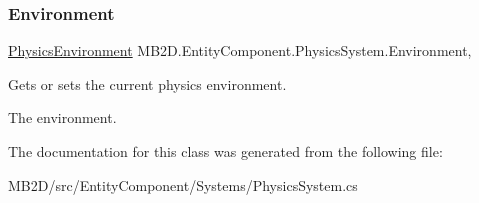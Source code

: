 \subsubsection{\texorpdfstring{Environment}{Environment}}
{\footnotesize\ttfamily \hyperlink{class_m_b2_d_1_1_entity_component_1_1_physics_environment}{Physics\+Environment} M\+B2\+D.\+Entity\+Component.\+Physics\+System.\+Environment\hspace{0.3cm}{\ttfamily [get]}, {\ttfamily [set]}}



Gets or sets the current physics environment. 

The environment.

The documentation for this class was generated from the following file\+:\begin{DoxyCompactItemize}
\item 
M\+B2\+D/src/\+Entity\+Component/\+Systems/Physics\+System.\+cs\end{DoxyCompactItemize}
